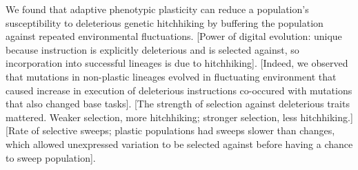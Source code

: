 We found that adaptive phenotypic plasticity can reduce a population's susceptibility to deleterious genetic hitchhiking by buffering the population against repeated environmental fluctuations.
[Power of digital evolution: unique because instruction is explicitly deleterious and is selected against, so incorporation into successful lineages is due to hitchhiking].
[Indeed, we observed that mutations in non-plastic lineages evolved in fluctuating environment that caused increase in execution of deleterious instructions co-occured with mutations that also changed base tasks].
[The strength of selection against deleterious traits mattered. Weaker selection, more hitchhiking; stronger selection, less hitchhiking.]
[Rate of selective sweeps; plastic populations had sweeps slower than changes, which allowed unexpressed variation to be selected against before having a chance to sweep population].






